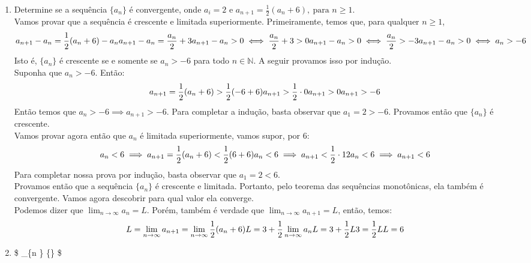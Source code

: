 \begin{enumerate}
\def\labelenumi{\arabic{enumi}.}
\setcounter{enumi}{21}
\item
  Determine se a sequência \(\{a_n\}\) é convergente, onde \(a_i = 2\) e
  \(a_{n+1} = \frac{1}{2} (a_n + 6), \ \text{para } n \geq 1\).\\
  Vamos provar que a sequência é crescente e limitada superiormente.
  Primeiramente, temos que, para qualquer \(n \geq 1\), \[
  a_{n+1} - a_n = \frac{1}{2} (a_n + 6) - a_n\\
  a_{n+1} - a_n = \frac{a_n}{2} + 3\\
  a_{n+1} - a_n > 0 \iff
  \frac{a_n}{2} + 3 > 0\\
  a_{n+1} - a_n > 0 \iff
  \frac{a_n}{2} > -3\\
  a_{n+1} - a_n > 0 \iff
  a_n > -6\\
  \] Isto é, \(\{a_n\}\) é crescente se e somente se \(a_n > -6\) para
  todo \(n \in \mathbb{N}\). A seguir provamos isso por indução.\\
  Suponha que \(a_n > -6\). Então: \[
  a_{n + 1} = \frac{1}{2} (a_n + 6) >
  \dfrac{1}{2} (-6 + 6)\\
  a_{n + 1} > \dfrac{1}{2} \cdot 0\\
  a_{n + 1} > 0\\
  a_{n + 1} > -6\\
  \] Então temos que \(a_n > -6 \implies a_{n+1} > -6\). Para completar
  a indução, basta observar que \(a_1 = 2 > -6\). Provamos então que
  \(\{a_n\}\) é crescente.\\
  Vamos provar agora então que \(a_n\) é limitada superiormente, vamos
  supor, por \(6\): \[
  a_n < 6 \implies
  a_{n+1} = \frac{1}{2} (a_n + 6) <
  \dfrac{1}{2} (6 + 6)\\
  a_n < 6 \implies
  a_{n+1} <
  \dfrac{1}{2} \cdot 12\\
  a_n < 6 \implies
  a_{n+1} < 6\\
  \] Para completar nossa prova por indução, basta observar que
  \(a_1 = 2 < 6\).\\
  Provamos então que a sequência \(\{a_n\}\) é crescente e limitada.
  Portanto, pelo teorema das sequências monotônicas, ela também é
  convergente. Vamos agora descobrir para qual valor ela converge.\\
  Podemos dizer que \(\lim_{n \to \infty} a_n = L\). Porém, também é
  verdade que \(\lim_{n \to \infty} a_{n + 1} = L\), então, temos: \[
  L = \lim_{n \to \infty} a_{n + 1} = 
  \lim_{n \to \infty} \dfrac{1}{2}(a_n + 6)\\ 
  L =  
  3 + \dfrac{1}{2} \lim_{n \to \infty} a_n\\
  L =  
  3 + \dfrac{1}{2} L\\  
  3 = \dfrac{1}{2} L\\
  L = 6 
  \]
\item
  \$ \lim\_\{n \to \infty\} 
  \{\} \$


\end{enumerate}
